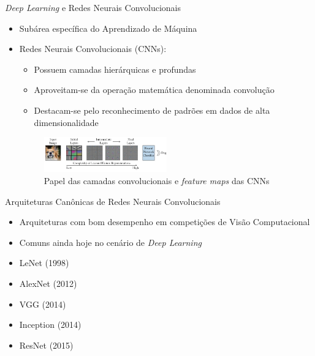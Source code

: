 \begin{frame}{\emph{Deep Learning} e Redes Neurais Convolucionais}
  \baselineskip
\begin{itemize}
	\item Subárea específica do Aprendizado de Máquina
	\bigskip
	\item Redes Neurais Convolucionais (CNNs):
    \begin{itemize}
      \item Possuem camadas hierárquicas e profundas
      \item Aproveitam-se da operação matemática denominada convolução
      \item Destacam-se pelo reconhecimento de padrões em dados de alta dimensionalidade
    \end{itemize}

    \begin{figure}
    	\caption{Papel das camadas convolucionais e \emph{feature maps} das CNNs}
    	\label{fig:camadas-convolucionais}
    	\includegraphics[width=0.5\textwidth]{./img/camadas-convolucionais}
    \end{figure}

\end{itemize}
\end{frame}


\begin{frame}{\Large{Arquiteturas Canônicas de Redes Neurais Convolucionais}}
\begin{itemize}
	\item Arquiteturas com bom desempenho em competições de Visão Computacional
	\item Comuns ainda hoje no cenário de \emph{Deep Learning}
	\bigskip
	\item LeNet (1998)
	\item AlexNet (2012)
	\item VGG (2014)
	\item Inception (2014)
	\item ResNet (2015)
\end{itemize}

\end{frame}
